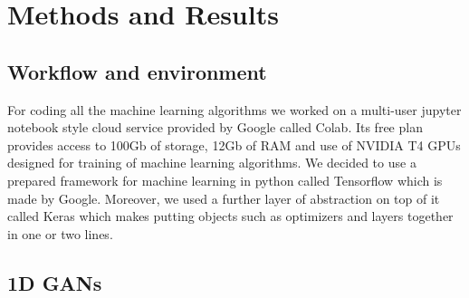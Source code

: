 \documentclass[11pt]{article} %
\begin{document}
\section{Methods and Results}
\subsection{Workflow and environment}
For coding all the machine learning algorithms we worked on a multi-user jupyter notebook style cloud service provided by Google called Colab. Its free plan provides access to 100Gb of storage, 12Gb of RAM and use of NVIDIA T4 GPUs designed for training of machine learning algorithms. We decided to use a prepared framework for machine learning in python called Tensorflow which is made by Google. Moreover, we used a further layer of abstraction on top of it called Keras which makes putting objects such as optimizers and layers together in one or two lines.
\subsection{1D GANs}
\end{document}
